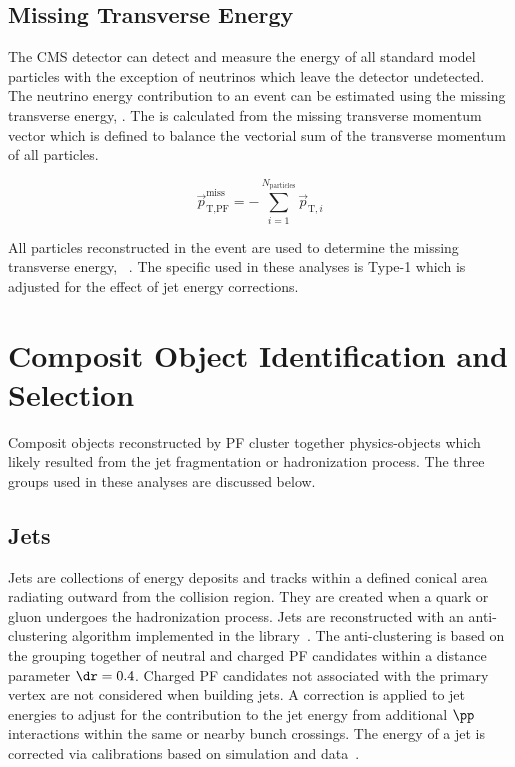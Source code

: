\subsection{Missing Transverse Energy}
\label{sec:obj_reco_met}
The CMS detector can detect and measure the energy of all standard model particles with the exception
of neutrinos which leave the detector undetected. The neutrino energy contribution to an event can
be estimated using the missing transverse energy, \etvecmiss. The \etvecmiss is calculated from
the missing transverse momentum vector which is defined 
to balance the vectorial sum of the transverse momentum of all particles.

\begin{equation}
\vec{p}^{\text{miss}}_{\text{T,PF}} = - \sum^{N_{\text{particles}}}_{i=1} \vec{p}_{\text{T},i}
\end{equation}

All particles reconstructed in the event are used to determine the missing transverse energy,
\etvecmiss~\cite{Khachatryan:2014gga}. The specific \etvecmiss used in these analyses is Type-1
\etvecmiss which is adjusted for the effect of jet energy corrections.


\section{Composit Object Identification and Selection}
Composit objects reconstructed by PF cluster together physics-objects which likely
resulted from the jet fragmentation or hadronization process. The three groups used in these
analyses are discussed below.

 
\subsection{Jets}
\label{sec:obj_reco_jets}
Jets are collections of energy deposits and tracks within a defined conical area radiating outward
from the collision region. They are created when a quark or gluon undergoes the hadronization process.
Jets are reconstructed with an anti-\kt clustering algorithm implemented in the \FASTJET 
library~\cite{Cacciari:2008gp, Cacciari:2011ma, Cacciari:fastjet2}. The anti-\kt clustering is based on the grouping
together of neutral and charged PF candidates within a distance parameter $\dr = 0.4$. Charged PF 
candidates not associated with the primary vertex are not considered when building jets.
A correction is applied to jet energies to adjust for the contribution to the jet energy from 
additional $\pp$ interactions within the same or nearby bunch crossings. The energy of a jet is 
corrected via calibrations based on simulation and data~\cite{CMS-JME-10-011}.


